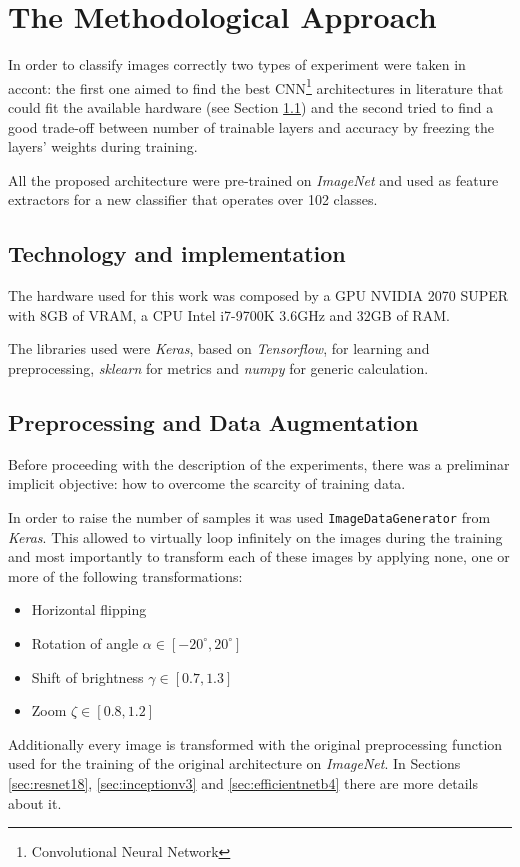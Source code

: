 \section{The Methodological Approach}

In order to classify images correctly two types of experiment were taken in accont: the first one aimed to find the best CNN\footnote{Convolutional Neural Network} architectures in 
literature that could fit the available hardware (see Section \ref{sec:tech}) and the second tried to find a good trade-off between number of trainable layers and accuracy by freezing the layers' weights during training. \par
All the proposed architecture were pre-trained on \textit{ImageNet} and used as feature extractors for a new classifier that operates over 102 classes.

\subsection{Technology and implementation}\label{sec:tech}
The hardware used for this work was composed by a GPU NVIDIA 2070 SUPER with 8GB of VRAM, a CPU Intel i7-9700K $3.6$GHz and $32$GB of RAM. \par
The libraries used were \textit{Keras}, based on \textit{Tensorflow}, for learning and preprocessing, \textit{sklearn} for metrics and \textit{numpy}  for generic calculation.

\subsection{Preprocessing and Data Augmentation}
Before proceeding with the description of the experiments, there was a preliminar implicit objective: how to overcome the scarcity of training data.\par
In order to raise the number of samples it was used \texttt{ImageDataGenerator} from \textit{Keras}. This allowed to virtually loop infinitely on the images during the training and most importantly to transform each of these images by applying none, one or more of the following transformations:
\begin{itemize}
\item{Horizontal flipping}
\item{Rotation of angle $\alpha \in [-20^{\circ}, 20^{\circ}]$}
\item{Shift of brightness $\gamma \in [0.7, 1.3]$}
\item{Zoom  $\zeta \in [0.8, 1.2]$}
\end{itemize}
Additionally every image is transformed with the original preprocessing function used for the training of the original architecture on \textit{ImageNet}. In Sections \ref{sec:resnet18}, \ref{sec:inceptionv3} and \ref{sec:efficientnetb4} there are more details about it.


